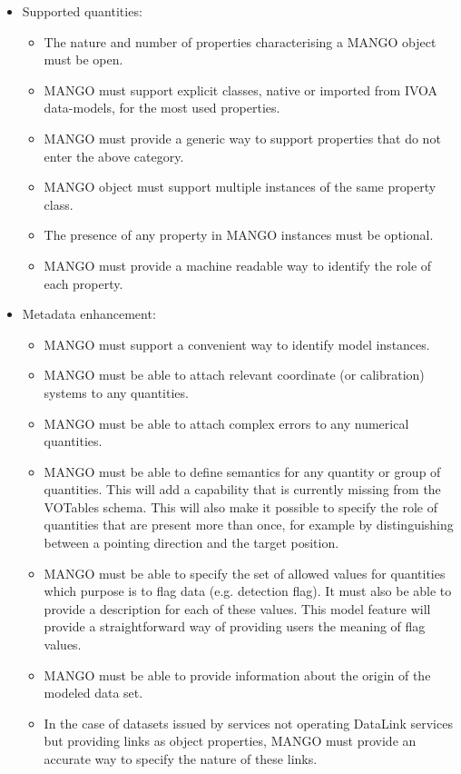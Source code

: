 \documentclass[11pt,a4paper]{ivoa}
\begin{document}
\begin{itemize}
    \item Supported quantities:
        \begin{itemize}[noitemsep,topsep=0pt,parsep=0pt,partopsep=0pt]
          \item The nature and number of properties characterising a MANGO object must be open. 
    
          \item MANGO must support explicit classes, native or imported from IVOA data-models,
                for the most used properties.
          \item MANGO must provide a generic way to support properties that do not enter the above category.
          \item MANGO object must support multiple instances of the same property class.
          \item The presence of any property in MANGO instances must be optional.    
    	  \item MANGO must provide a machine readable way to identify the role of each property.
        
   	    \end{itemize}   
    
    \item Metadata enhancement:
        \begin{itemize}[noitemsep,topsep=0pt,parsep=0pt,partopsep=0pt]
          \item MANGO must support a convenient way to identify model instances.
          \item MANGO must be able to attach relevant coordinate (or calibration) 
                systems to any quantities. 
          \item MANGO must be able to attach complex errors to any numerical quantities. 
          \item MANGO must be able to define semantics for any quantity or group of quantities. 
                This will add a capability that is currently missing from the VOTables schema. 
                This will also make it possible to specify the role of quantities 
                that are present more than once, for example by distinguishing between a pointing direction 
                and the target position. 
          \item MANGO must be able to specify the set of allowed values for quantities which purpose is to flag data 
                (e.g. detection flag). It must also be able to provide a description for each of these values. 
                This model feature will provide a straightforward way of providing users the meaning of flag values. 
          \item MANGO must be able to provide information about the origin of the modeled data set.         
          \item In the case of datasets issued by services not operating DataLink services  \citep{2023ivoa.spec.1215B} but providing 
                links as object properties, MANGO must provide an accurate way to specify the nature of these links. 
        \end{itemize}  
         

\end{itemize}
\end{document}
